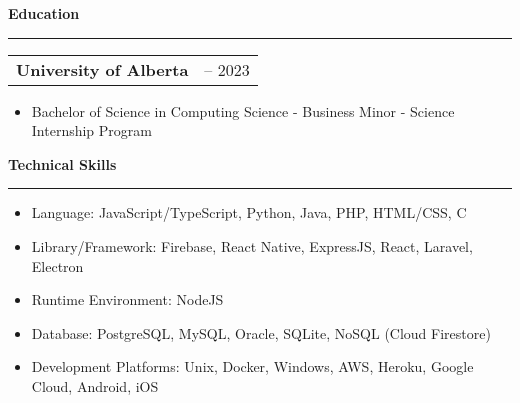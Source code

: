 \documentclass[11pt]{article}
\newenvironment{compactList}
{
  \begin{itemize}
    \setlength{\itemsep}{0pt}
    \setlength{\parskip}{0pt}
}
{\end{itemize}}
\begin{document}
\begin{center}
  \textbf{Education}
  \noindent\rule[10pt]{0.9\paperwidth}{0.4pt}
\end{center}
\vspace{-20pt}
\begin{tabularx}{\textwidth}
  {
    >{\raggedright\arraybackslash}X
    >{\raggedleft\arraybackslash}X
  }
  \textbf{University of Alberta} & 2017 – 2023 \\
\end{tabularx}
\vspace{-20pt}
\begin{itemize}
  \item Bachelor of Science in Computing Science - Business Minor - Science Internship Program
\end{itemize}
\vspace{-15pt}

\begin{center}
  \textbf{Technical Skills}
  \noindent\rule[10pt]{0.9\paperwidth}{0.4pt}
\end{center}
\vspace{-30pt}
\begin{compactList}
  \item Language: JavaScript/TypeScript, Python, Java, PHP, HTML/CSS, C
  \item Library/Framework: Firebase, React Native, ExpressJS, React, Laravel, Electron
  \item Runtime Environment: NodeJS
  \item Database: PostgreSQL, MySQL, Oracle, SQLite, NoSQL (Cloud Firestore)
  \item Development Platforms: Unix, Docker, Windows, AWS, Heroku, Google Cloud, Android, iOS
\end{compactList}
\vspace{-15pt}
\end{document}
